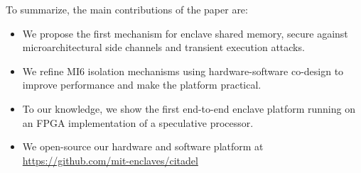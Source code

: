 To summarize, the main contributions of the paper are:
\begin{itemize}
\itemsep-0.1em
\item We propose the first mechanism for enclave shared memory, secure against microarchitectural side channels and transient execution attacks.
\item We refine MI6 isolation mechanisms using hardware-software co-design to improve performance and make the platform practical.
\item To our knowledge, we show the first end-to-end enclave platform running on an FPGA implementation of a speculative processor.
\item We open-source our hardware and software platform at \url{https://github.com/mit-enclaves/citadel}
\end{itemize}